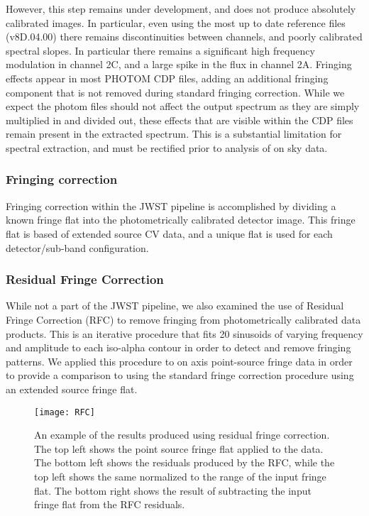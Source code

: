 However, this step remains under development, and does not produce absolutely calibrated images. In particular, even using the most up to date reference files (v8D.04.00) there remains discontinuities between channels, and poorly calibrated spectral slopes.
In particular there remains a significant high frequency modulation in channel 2C, and a large spike in the flux in channel 2A.
Fringing effects appear in most PHOTOM CDP files, adding an additional fringing component that is not removed during standard fringing correction.
While we expect the photom files should not affect the output spectrum as they are simply multiplied in and divided out, these effects that are visible within the CDP files remain present in the extracted spectrum.
This is a substantial limitation for spectral extraction, and must be rectified prior to analysis of on sky data. 

\subsubsection{Fringing correction}
Fringing correction within the JWST pipeline is accomplished by dividing a known fringe flat into the photometrically calibrated detector image. 
This fringe flat is based of extended source CV data, and a unique flat is used for each detector/sub-band configuration.

\subsubsection{Residual Fringe Correction}
While not a part of the JWST pipeline, we also examined the use of Residual Fringe Correction (RFC) \parencite{Lahuis2003,Lahuis2018} to remove fringing from photometrically calibrated data products. 
This is an iterative procedure that fits 20 sinusoids of varying frequency and amplitude to each iso-alpha contour in order to detect and remove fringing patterns.
We applied this procedure to on axis point-source fringe data in order to provide a comparison to using the standard fringe correction procedure using an extended source fringe flat.
\begin{figure}[t]
	\centering
	\texttt{[image: RFC]}
	\caption{An example of the results produced using residual fringe correction. The top left shows the point source fringe flat applied to the data. The bottom left shows the residuals produced by the RFC, while the top left shows the same normalized to the range of the input fringe flat. The bottom right shows the result of subtracting the input fringe flat from the RFC residuals.}
	\label{fig:RFC}
\end{figure}


